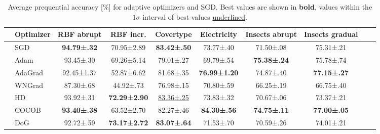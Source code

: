 \documentclass[runningheads]{llncs}
\begin{document}
\begin{table}[ht]
	\centering
	\scriptsize
	\caption{Average prequential accuracy [\%] for adaptive optimizers and SGD. Best values are shown in \textbf{bold}, values within the $1\sigma$ interval of best values \underline{underlined}.}
	\begin{tabular}{llcccccccc}
		\toprule
		                                                   & Optimizer                                                                         & RBF abrupt          & RBF incr.            & Covertype             & Electricity          & Insects abrupt      & Insects gradual     \\
		\midrule
		\multirow{5}{*}{\rotatebox[origin=c]{90}{Tuned}}   & SGD                                                                               & \bfseries 94.79±.32 & 70.95±2.89           & \bfseries 83.42±.50   & 73.77±.40            & 71.50±.08           & 75.31±.21           \\
		                                                   & Adam \cite{kingmaAdamMethodStochastic2017b}                                       & 93.45±.30           & 69.26±5.14           & 79.01±.27             & 69.79±.54            & \bfseries 75.38±.24 & 75.78±.74           \\
		                                                   & AdaGrad \cite{duchiAdaptiveSubgradientMethods2011}                                & 92.45±1.37          & 52.87±6.62           & 81.68±.35             & \bfseries 76.99±1.20 & 74.87±.40           & \bfseries 77.15±.27 \\
		                                                   & WNGrad  \cite{wuWNGradLearnLearning2020}                                          & 87.30±.68           & 44.92±.73            & 76.98±.15             & 70.80±.59            & 66.25±.19           & 66.75±.40           \\
		                                                   & HD \cite{baydinOnlineLearningRate2018}                                            & 93.92±.31           & \bfseries 72.29±2.90 & \underline{83.36±.25} & 73.83±.32            & 70.67±.06           & 73.37±.21           \\ \midrule
		\multirow{4}{*}{\rotatebox[origin=c]{90}{LR-Free}} & COCOB                               \cite{orabonaTrainingDeepNetworks2017}        & \bfseries 93.40±.38 & 63.52±2.70           & 82.27±.46             & \bfseries 84.30±.56  & \bfseries 74.75±.11 & \bfseries 77.00±.05 \\
		                                                   & DoG \cite{ivgiDoGSGDBest2023}                                                     & 92.72±.59           & \bfseries 73.17±2.72 & \bfseries 83.07±.64   & 71.53±.70            & 70.59±.26           & 74.01±.21           \\

\end{tabular}
\end{table}
\end{document}
